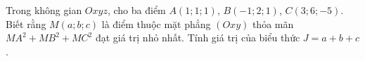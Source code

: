 \begin{ex}
Trong không gian $Oxyz$, cho ba điểm $A(1;1;1)$, $B(-1;2;1)$, $C(3;6;-5)$. Biết rằng $M(a;b;c)$ là điểm thuộc mặt phẳng $(Oxy)$ thỏa mãn $MA^2+MB^2+MC^2$ đạt giá trị nhỏ nhất. Tính giá trị của biểu thức $J=a+b+c$.
\end{ex}
